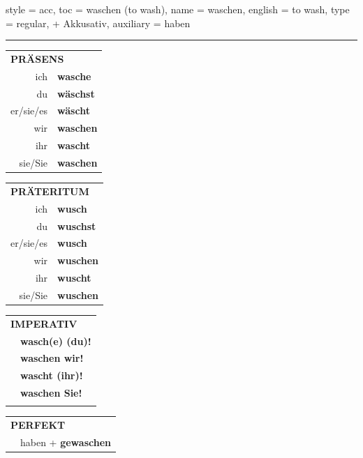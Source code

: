 \begin{verbentry}{
  style = {acc},
  toc = {waschen (to wash)},
  name = {waschen},
  english = {to wash},
  type = {regular, + Akkusativ},
  auxiliary = {haben}
}
 
    
     \vspace{5pt}

    \hrule
    
    \vspace{5pt}

  \begin{tabular}{rl}
     \multicolumn{2}{l}{\textbf{PRÄSENS} }\\
    ich & \textbf{wasche}\\
    du & \textbf{wäschst}\\
    er/sie/es & \textbf{wäscht}\\
    wir & \textbf{waschen}\\
    ihr & \textbf{wascht}\\
    sie/Sie & \textbf{waschen}\\
  \end{tabular}
  \hfill
     \begin{tabular}{rl}
    \multicolumn{2}{l}{\textbf{PRÄTERITUM} }\\
    ich & \textbf{wusch}\\
    du & \textbf{wuschst}\\
    er/sie/es & \textbf{wusch}\\
    wir & \textbf{wuschen}\\
    ihr & \textbf{wuscht}\\
    sie/Sie & \textbf{wuschen}\\
  \end{tabular}
  \hfill
  \begin{tabular}{rl}
     \multicolumn{2}{l}{\textbf{IMPERATIV} }\\
   & \textbf{wasch(e) (du)!}\\
   & \textbf{waschen wir!}\\
   & \textbf{wascht (ihr)!}\\
   & \textbf{waschen Sie!}\\
   & \vspace{10pt}
  \end{tabular}

    \vspace{10pt}

 \begin{tabular}{rl}
     \multicolumn{2}{l}{\textbf{PERFEKT}}\\
  &  haben + \textbf{gewaschen}\\
  \end{tabular}
\hfill
   \begin{tabular}{rl}
   

\end{tabular}
\end{verbentry}
